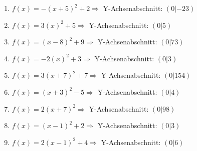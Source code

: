 \documentclass{article}%
\begin{document}
\begin{enumerate}[label=\alph*)]
\item%
\newline\vspace{0.5cm}$f(x)=-(x+5)^2 +2 \Rightarrow $ Y-Achsenabschnitt: $ (0|-23) $%
\item%
\newline\vspace{0.5cm}$f(x)=3(x)^2 +5 \Rightarrow $ Y-Achsenabschnitt: $ (0|5) $%
\item%
\newline\vspace{0.5cm}$f(x)=(x-8)^2 +9 \Rightarrow $ Y-Achsenabschnitt: $ (0|73) $%
\item%
\newline\vspace{0.5cm}$f(x)=-2(x)^2 +3 \Rightarrow $ Y-Achsenabschnitt: $ (0|3) $%
\item%
\newline\vspace{0.5cm}$f(x)=3(x+7)^2 +7 \Rightarrow $ Y-Achsenabschnitt: $ (0|154) $%
\item%
\newline\vspace{0.5cm}$f(x)=(x+3)^2 -5 \Rightarrow $ Y-Achsenabschnitt: $ (0|4) $%
\item%
\newline\vspace{0.5cm}$f(x)=2(x+7)^2 \Rightarrow $ Y-Achsenabschnitt: $ (0|98) $%
\item%
\newline\vspace{0.5cm}$f(x)=(x-1)^2 +2 \Rightarrow $ Y-Achsenabschnitt: $ (0|3) $%
\item%
\newline\vspace{0.5cm}$f(x)=2(x-1)^2 +4 \Rightarrow $ Y-Achsenabschnitt: $ (0|6) $%
\end{enumerate}

%
\end{document}
